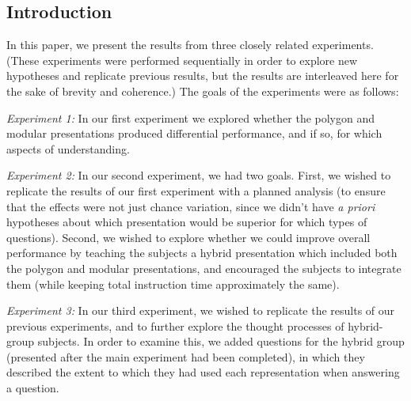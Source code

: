 \documentclass[man,10pt]{apa6}
\begin{document}
\subsection{Introduction}
In this paper, we present the results from three closely related experiments. (These experiments were performed sequentially in order to explore new hypotheses and replicate previous results, but the results are interleaved here for the sake of brevity and coherence.) The goals of the experiments were as follows: \par
\textit{Experiment 1:} In our first experiment we explored whether the polygon and modular presentations produced differential performance, and if so, for which aspects of understanding. \par
\textit{Experiment 2:} In our second experiment, we had two goals. First, we wished to replicate the results of our first experiment with a planned analysis (to ensure that the effects were not just chance variation, since we didn't have \textit{a priori} hypotheses about which presentation would be superior for which types of questions). Second, we wished to explore whether we could improve overall performance by teaching the subjects a hybrid presentation which included both the polygon and modular presentations, and encouraged the subjects to integrate them (while keeping total instruction time approximately the same). \par
\textit{Experiment 3:} In our third experiment, we wished to replicate the results of our previous experiments, and to further explore the thought processes of hybrid-group subjects. In order to examine this, we added questions for the hybrid group (presented after the main experiment had been completed), in which they described the extent to which they had used each representation when answering a question. 
\end{document}
